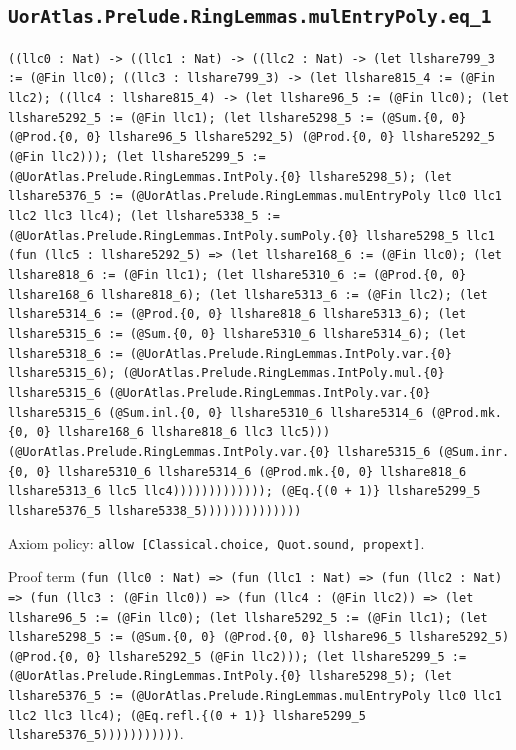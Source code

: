 \documentclass[11pt]{article}
\begin{document}
\subsection*{\texttt{UorAtlas.Prelude.RingLemmas.mulEntryPoly.eq\_1}}
\noindent\texttt{((llc0 : Nat) -> ((llc1 : Nat) -> ((llc2 : Nat) -> (let llshare799\_3 := (@Fin llc0); ((llc3 : llshare799\_3) -> (let llshare815\_4 := (@Fin llc2); ((llc4 : llshare815\_4) -> (let llshare96\_5 := (@Fin llc0); (let llshare5292\_5 := (@Fin llc1); (let llshare5298\_5 := (@Sum.\{0, 0\} (@Prod.\{0, 0\} llshare96\_5 llshare5292\_5) (@Prod.\{0, 0\} llshare5292\_5 (@Fin llc2))); (let llshare5299\_5 := (@UorAtlas.Prelude.RingLemmas.IntPoly.\{0\} llshare5298\_5); (let llshare5376\_5 := (@UorAtlas.Prelude.RingLemmas.mulEntryPoly llc0 llc1 llc2 llc3 llc4); (let llshare5338\_5 := (@UorAtlas.Prelude.RingLemmas.IntPoly.sumPoly.\{0\} llshare5298\_5 llc1 (fun (llc5 : llshare5292\_5) => (let llshare168\_6 := (@Fin llc0); (let llshare818\_6 := (@Fin llc1); (let llshare5310\_6 := (@Prod.\{0, 0\} llshare168\_6 llshare818\_6); (let llshare5313\_6 := (@Fin llc2); (let llshare5314\_6 := (@Prod.\{0, 0\} llshare818\_6 llshare5313\_6); (let llshare5315\_6 := (@Sum.\{0, 0\} llshare5310\_6 llshare5314\_6); (let llshare5318\_6 := (@UorAtlas.Prelude.RingLemmas.IntPoly.var.\{0\} llshare5315\_6); (@UorAtlas.Prelude.RingLemmas.IntPoly.mul.\{0\} llshare5315\_6 (@UorAtlas.Prelude.RingLemmas.IntPoly.var.\{0\} llshare5315\_6 (@Sum.inl.\{0, 0\} llshare5310\_6 llshare5314\_6 (@Prod.mk.\{0, 0\} llshare168\_6 llshare818\_6 llc3 llc5))) (@UorAtlas.Prelude.RingLemmas.IntPoly.var.\{0\} llshare5315\_6 (@Sum.inr.\{0, 0\} llshare5310\_6 llshare5314\_6 (@Prod.mk.\{0, 0\} llshare818\_6 llshare5313\_6 llc5 llc4))))))))))))); (@Eq.\{(0 + 1)\} llshare5299\_5 llshare5376\_5 llshare5338\_5))))))))))))))}\par
\noindent Axiom policy: \texttt{allow [Classical.choice, Quot.sound, propext]}.\par
\noindent Proof term \texttt{(fun (llc0 : Nat) => (fun (llc1 : Nat) => (fun (llc2 : Nat) => (fun (llc3 : (@Fin llc0)) => (fun (llc4 : (@Fin llc2)) => (let llshare96\_5 := (@Fin llc0); (let llshare5292\_5 := (@Fin llc1); (let llshare5298\_5 := (@Sum.\{0, 0\} (@Prod.\{0, 0\} llshare96\_5 llshare5292\_5) (@Prod.\{0, 0\} llshare5292\_5 (@Fin llc2))); (let llshare5299\_5 := (@UorAtlas.Prelude.RingLemmas.IntPoly.\{0\} llshare5298\_5); (let llshare5376\_5 := (@UorAtlas.Prelude.RingLemmas.mulEntryPoly llc0 llc1 llc2 llc3 llc4); (@Eq.refl.\{(0 + 1)\} llshare5299\_5 llshare5376\_5)))))))))))}.\par
\end{document}
